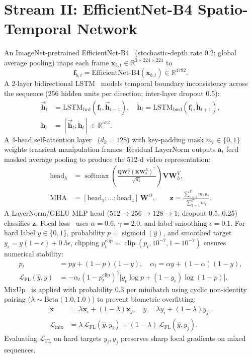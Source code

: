 \documentclass[runningheads]{llncs}
\newcommand{\R}{\mathbb{R}}
\newcommand{\bx}{\mathbf{x}}
\newcommand{\bz}{\mathbf{z}}
\newcommand{\bh}{\mathbf{h}}
\DeclareMathOperator{\sigm}{sigmoid}
\DeclareMathOperator{\clip}{clip}
\DeclareMathOperator{\softmax}{softmax}
\begin{document}
\section{Stream II: EfficientNet-B4 Spatio-Temporal Network}
An ImageNet-pretrained EfficientNet-B4~\cite{tan2019efficientnet} (stochastic-depth rate 0.2; global average pooling) maps each frame $\bx_{b,t}\in\R^{3\times 224\times 224}$ to
\begin{equation}
\mathbf f_{b,t}=\text{EfficientNet-B4}(\bx_{b,t})\in\R^{1792}.
\end{equation}
A 2-layer bidirectional LSTM~\cite{hochreiter1997lstm} models temporal boundary inconsistency across the sequence (256 hidden units per direction; inter-layer dropout 0.5):
\begin{align}
\overrightarrow{\bh}_t&=\mathrm{LSTM}_{\mathrm{fwd}}(\mathbf f_t,\overrightarrow{\bh}_{t-1}),\quad
\overleftarrow{\bh}_t=\mathrm{LSTM}_{\mathrm{bwd}}(\mathbf f_t,\overleftarrow{\bh}_{t+1}),\\
\bh_t&=[\overrightarrow{\bh}_t;\overleftarrow{\bh}_t]\in\R^{512}.
\end{align}
A 4-head self-attention layer~\cite{vaswani2017attention} ($d_k{=}128$) with key-padding mask $m_t\in\{0,1\}$ weights transient manipulation frames. Residual LayerNorm outputs $\mathbf a_t$ feed masked average pooling to produce the 512-d video representation:
\begin{align}
\mathrm{head}_h&=\softmax\!\left(\frac{\mathbf Q\mathbf W^{Q}_h(\mathbf K\mathbf W^{K}_h)^{\top}}{\sqrt{d_k}}\right)\mathbf V\mathbf W^{V}_h,\\
\mathrm{MHA}&=[\mathrm{head}_1;\dots;\mathrm{head}_4]\,\mathbf W^{O},\qquad
\bz=\frac{\sum_{t=1}^{T}m_t\,\mathbf a_t}{\sum_{t=1}^{T}m_t}.
\end{align}
A LayerNorm/GELU MLP head ($512{\to}256{\to}128{\to}1$; dropout 0.5, 0.25) classifies $\bz$. Focal loss~\cite{lin2017focal} uses $\alpha{=}0.6$, $\gamma{=}2.0$, and label smoothing $\epsilon{=}0.1$. For hard label $y\in\{0,1\}$, probability $p=\sigm(\hat y)$, and smoothed target $y_\epsilon=y(1-\epsilon)+0.5\epsilon$, clipping $p_t^{\mathrm{clip}}=\clip(p_t,10^{-7},1-10^{-7})$ ensures numerical stability:
\begin{align}
p_t&=py+(1-p)(1-y),\quad \alpha_t=\alpha y+(1-\alpha)(1-y),\\
\mathcal L_{\mathrm{FL}}(\hat y,y)&=-\alpha_t(1-p_t^{\mathrm{clip}})^\gamma\bigl[y_\epsilon\log p+(1-y_\epsilon)\log(1-p)\bigr].
\end{align}
MixUp~\cite{zhang2018mixup} is applied with probability 0.3 per minibatch using cyclic non-identity pairing ($\lambda\sim\mathrm{Beta}(1.0,1.0)$) to prevent biometric overfitting:
\begin{align}
\tilde{\bx}&=\lambda\bx_i+(1-\lambda)\bx_j,\quad \tilde y=\lambda y_i+(1-\lambda)y_j,\\
\mathcal L_{\mathrm{mix}}&=\lambda\,\mathcal L_{\mathrm{FL}}(\hat y,y_i)+(1-\lambda)\,\mathcal L_{\mathrm{FL}}(\hat y,y_j).
\end{align}
Evaluating $\mathcal L_{\mathrm{FL}}$ on hard targets $y_i,y_j$ preserves sharp focal gradients on mixed sequences.
\end{document}
